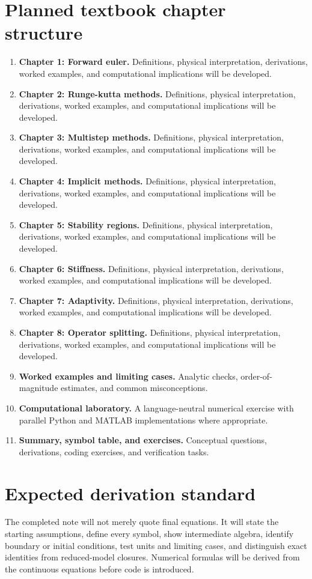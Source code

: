 \documentclass[11pt]{article}
\begin{document}
\section{Planned textbook chapter structure}
\begin{enumerate}[leftmargin=1.8em]
\item \textbf{Chapter 1: Forward euler.} Definitions, physical interpretation, derivations, worked examples, and computational implications will be developed.
\item \textbf{Chapter 2: Runge-kutta methods.} Definitions, physical interpretation, derivations, worked examples, and computational implications will be developed.
\item \textbf{Chapter 3: Multistep methods.} Definitions, physical interpretation, derivations, worked examples, and computational implications will be developed.
\item \textbf{Chapter 4: Implicit methods.} Definitions, physical interpretation, derivations, worked examples, and computational implications will be developed.
\item \textbf{Chapter 5: Stability regions.} Definitions, physical interpretation, derivations, worked examples, and computational implications will be developed.
\item \textbf{Chapter 6: Stiffness.} Definitions, physical interpretation, derivations, worked examples, and computational implications will be developed.
\item \textbf{Chapter 7: Adaptivity.} Definitions, physical interpretation, derivations, worked examples, and computational implications will be developed.
\item \textbf{Chapter 8: Operator splitting.} Definitions, physical interpretation, derivations, worked examples, and computational implications will be developed.
\item \textbf{Worked examples and limiting cases.} Analytic checks, order-of-magnitude estimates, and common misconceptions.
\item \textbf{Computational laboratory.} A language-neutral numerical exercise with parallel Python and MATLAB implementations where appropriate.
\item \textbf{Summary, symbol table, and exercises.} Conceptual questions, derivations, coding exercises, and verification tasks.
\end{enumerate}

\section{Expected derivation standard}
The completed note will not merely quote final equations. It will state the starting assumptions, define every symbol, show intermediate algebra, identify boundary or initial conditions, test units and limiting cases, and distinguish exact identities from reduced-model closures. Numerical formulas will be derived from the continuous equations before code is introduced.
\end{document}
